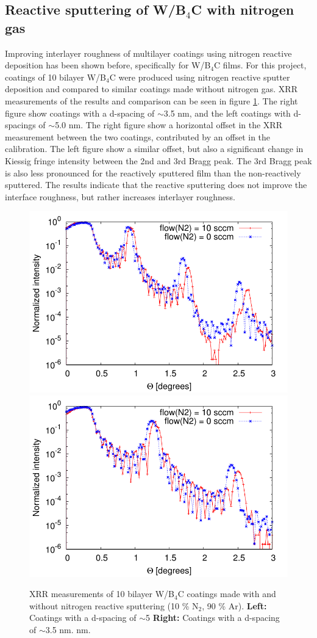 \subsection{Reactive sputtering of W/B$_4$C with nitrogen gas}
Improving interlayer roughness of multilayer coatings using nitrogen reactive deposition has been shown before\cite{Windt:2007uj,jakobsen2010developing}, specifically for W/B$_4$C films. For this project, coatings of 10 bilayer W/B$_4$C were produced using nitrogen reactive sputter deposition and compared to similar coatings made without nitrogen gas. XRR measurements of the results and comparison can be seen in figure \ref{fig:wb4c-n2}. The right figure show coatings with a d-spacing of $\sim$3.5 nm, and the left coatings with d-spacings of $\sim$5.0 nm. The right figure show a horizontal offset in the XRR measurement between the two coatings, contributed by an offset in the calibration. The left figure show a similar offset, but also a significant change in Kiessig fringe intensity between the 2nd and 3rd Bragg peak. The 3rd Bragg peak is also less pronounced for the reactively sputtered film than the non-reactively sputtered. The results indicate that the reactive sputtering does not improve the interface roughness, but rather increases interlayer roughness.

\begin{figure}[!h]
	\center
  \includegraphics[width=0.47\linewidth]{figures/athena/coatings/w-b4c_n2_50AA.pdf}	\includegraphics[width=0.47\linewidth]{figures/athena/coatings/w-b4c_n2_35AA.pdf}
\caption{\footnotesize XRR measurements of 10 bilayer W/B$_4$C coatings made with and without nitrogen reactive sputtering (10 \% N$_2$, 90 \% Ar).  \textbf{Left:} Coatings with a d-spacing of $\sim$5 \textbf{Right:} Coatings with a d-spacing of $\sim$3.5 nm. nm.}\label{fig:wb4c-n2}
\end{figure}

